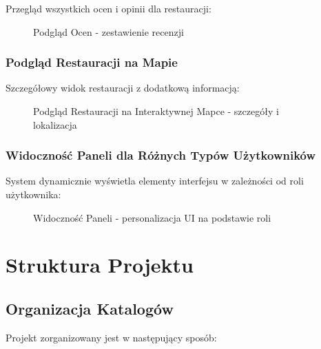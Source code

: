 \documentclass[12pt,a4paper,utf-8]{article}
\begin{document}
Przegląd wszystkich ocen i opinii dla restauracji:

\begin{figure}[H]
    \centering
    \caption{Podgląd Ocen  -  zestawienie recenzji}
    \label{fig:ratings_view}
\end{figure}

\subsubsection{Podgląd Restauracji na Mapie}

Szczegółowy widok restauracji z dodatkową informacją:

\begin{figure}[H]
    \centering
    \caption{Podgląd Restauracji na Interaktywnej Mapce  -  szczegóły i lokalizacja}
    \label{fig:restaurant_map_view}
\end{figure}

\subsubsection{Widoczność Paneli dla Różnych Typów Użytkowników}

System dynamicznie wyświetla elementy interfejsu w zależności od roli użytkownika:

\begin{figure}[H]
    \centering
    \caption{Widoczność Paneli  -  personalizacja UI na podstawie roli}
    \label{fig:rbac_visibility}
\end{figure}

\newpage

\newpage

\section{Struktura Projektu}

\subsection{Organizacja Katalogów}

Projekt zorganizowany jest w następujący sposób:
\end{document}
